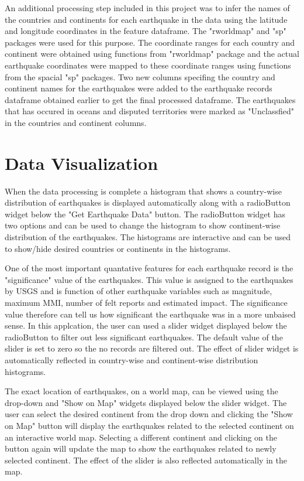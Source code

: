 \documentclass{article}
\begin{document}
		An additional processing step included in this project was to infer the names of the countries and continents for each earthquake in the data using the latitude and longitude coordinates in the feature dataframe. The "rworldmap" and "sp" packages were used for this purpose. The coordinate ranges for each country and continent were obtained using functions
		from "rworldmap" package and the actual earthquake coordinates were mapped to these coordinate ranges using functions from the spacial "sp" packages. Two new columns specifing the country and continent names for the earthquakes were added to the earthquake records dataframe obtained earlier to get the final processed dataframe. The earthquakes that has occured in oceans and disputed territories were marked as "Unclassfied" in the countries and continent columns.
	
	\section{Data Visualization}
		When the data processing is complete a histogram that shows a country-wise distribution of earthquakes is displayed automatically along with a radioButton widget below the "Get Earthquake Data" button. The radioButton widget has two options and can be used to change the histogram to show continent-wise distribution of the earthquakes. The histograms are interactive and can be used to show/hide desired countries or continents in the histograms.
		
		One of the most important quantative features for each earthquake record is the "significance" value of the earthquakes. This value is assigned to the earthquakes by USGS and is function of other earthquake variables such as magnitude, maximum MMI, number of felt reports and estimated impact. The significance value therefore can tell us how significant the earthquake was in a more unbaised sense. In this applcation, the user can used a slider widget displayed below the radioButton to filter out less significant earthquakes. The default value of the slider is set to zero so the no records are filtered out. The effect of slider widget is automatically reflected in country-wise and continent-wise distribution histograms.
		
		The exact location of earthquakes, on a world map, can be viewed using the drop-down and "Show on Map" widgets displayed below the slider widget. The user can select the desired continent from the drop down and clicking the "Show on Map" button will display the earthquakes related to the selected continent on an interactive world map. Selecting a different continent and clicking on the button again will update the map to show the earthquakes related to newly selected continent. The effect of the slider is also reflected automatically in the map.
		
\end{document}
